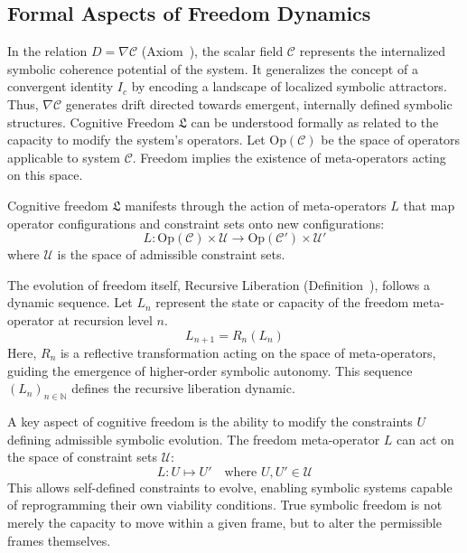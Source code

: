 \subsection*{Formal Aspects of Freedom Dynamics}
\label{subsec:bk9_formal_aspects_of_freedom_dynamics}
In the relation $D = \nabla \mathcal{C}$ (Axiom~), the scalar field $\mathcal{C}$ represents the internalized symbolic coherence potential of the system. It generalizes the concept of a convergent identity $I_c$ by encoding a landscape of localized symbolic attractors. Thus, $\nabla \mathcal{C}$ generates drift directed towards emergent, internally defined symbolic structures.
Cognitive Freedom $\mathfrak{L}$ can be understood formally as related to the capacity to modify the system's operators. Let $\text{Op}(\mathcal{C})$ be the space of operators applicable to system $\mathcal{C}$. Freedom implies the existence of meta-operators acting on this space.
\begin{definition}\label{definition:bk9_meta_operator_action}
Cognitive freedom $\mathfrak{L}$ manifests through the action of meta-operators $L$ that map operator configurations and constraint sets onto new configurations:
\[
L: \text{Op}(\mathcal{C}) \times \mathcal{U} \to \text{Op}(\mathcal{C}') \times \mathcal{U}'
\]
where $\mathcal{U}$ is the space of admissible constraint sets.
\end{definition}
The evolution of freedom itself, Recursive Liberation (Definition~), follows a dynamic sequence. Let $L_n$ represent the state or capacity of the freedom meta-operator at recursion level $n$.
\begin{equation}
L_{n+1} = R_n(L_n)
\end{equation}
Here, $R_n$ is a reflective transformation acting on the space of meta-operators, guiding the emergence of higher-order symbolic autonomy. This sequence $(L_n)_{n \in \mathbb{N}}$ defines the recursive liberation dynamic.
\begin{definition}\label{definition:bk9_freedom_acting_on_constraints}
A key aspect of cognitive freedom is the ability to modify the constraints $U$ defining admissible symbolic evolution. The freedom meta-operator $L$ can act on the space of constraint sets $\mathcal{U}$:
\[
L: U \mapsto U' \quad \text{where } U, U' \in \mathcal{U}
\]
This allows self-defined constraints to evolve, enabling symbolic systems capable of reprogramming their own viability conditions. True symbolic freedom is not merely the capacity to move within a given frame, but to alter the permissible frames themselves.
\end{definition}
